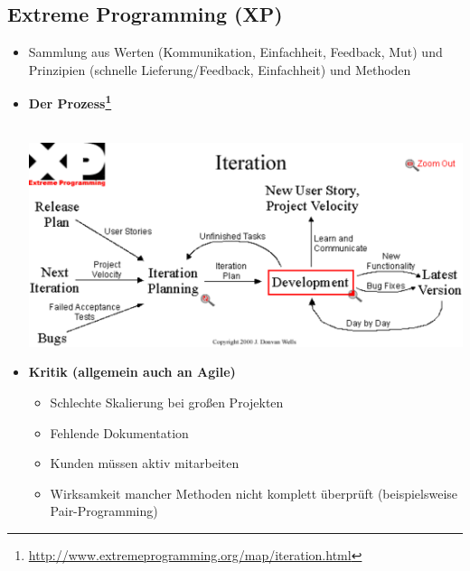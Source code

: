\subsection{Extreme Programming (XP)}
\begin{itemize}
	\item Sammlung aus Werten (Kommunikation, Einfachheit, Feedback, Mut) und Prinzipien (schnelle Lieferung/Feedback, Einfachheit) und Methoden
	\item \textbf{Der Prozess\footnote{\url{http://www.extremeprogramming.org/map/iteration.html}}}\\\\
		\begin{minipage}{\linewidth}
			\includegraphics[scale=0.7]{swt2/xp_iteration.pdf}
		\end{minipage}
	\item \textbf{Kritik (allgemein auch an Agile)}
	\begin{itemize}
		\item Schlechte Skalierung bei großen Projekten
		\item Fehlende Dokumentation
		\item Kunden müssen aktiv mitarbeiten
		\item Wirksamkeit mancher Methoden nicht komplett überprüft (beispielsweise Pair-Programming)
	\end{itemize}
\end{itemize}


